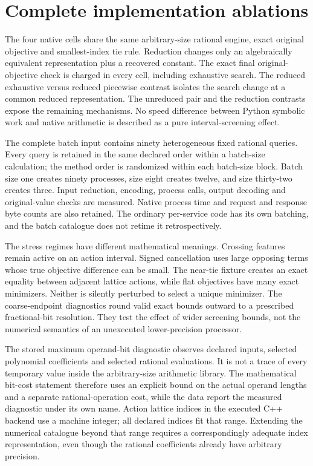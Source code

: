 \section{Complete implementation ablations}\label{supp:ablation61}


The four native cells share the same arbitrary-size rational engine, exact original objective and smallest-index tie rule. Reduction changes only an algebraically equivalent representation plus a recovered constant. The exact final original-objective check is charged in every cell, including exhaustive search. The reduced exhaustive versus reduced piecewise contrast isolates the search change at a common reduced representation. The unreduced pair and the reduction contrasts expose the remaining mechanisms. No speed difference between Python symbolic work and native arithmetic is described as a pure interval-screening effect.

The complete batch input contains ninety heterogeneous fixed rational queries. Every query is retained in the same declared order within a batch-size calculation; the method order is randomized within each batch-size block. Batch size one creates ninety processes, size eight creates twelve, and size thirty-two creates three. Input reduction, encoding, process calls, output decoding and original-value checks are measured. Native process time and request and response byte counts are also retained. The ordinary per-service code has its own batching, and the batch catalogue does not retime it retrospectively.



The stress regimes have different mathematical meanings. Crossing features remain active on an action interval. Signed cancellation uses large opposing terms whose true objective difference can be small. The near-tie fixture creates an exact equality between adjacent lattice actions, while flat objectives have many exact minimizers. Neither is silently perturbed to select a unique minimizer. The coarse-endpoint diagnostics round valid exact bounds outward to a prescribed fractional-bit resolution. They test the effect of wider screening bounds, not the numerical semantics of an unexecuted lower-precision processor.

The stored maximum operand-bit diagnostic observes declared inputs, selected polynomial coefficients and selected rational evaluations. It is not a trace of every temporary value inside the arbitrary-size arithmetic library. The mathematical bit-cost statement therefore uses an explicit bound on the actual operand lengths and a separate rational-operation cost, while the data report the measured diagnostic under its own name. Action lattice indices in the executed C++ backend use a machine integer; all declared indices fit that range. Extending the numerical catalogue beyond that range requires a correspondingly adequate index representation, even though the rational coefficients already have arbitrary precision.

